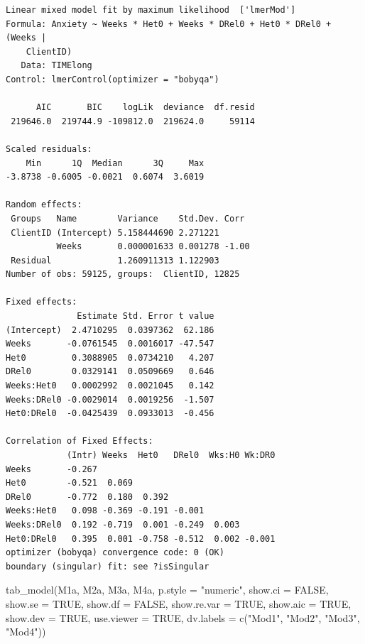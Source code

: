 \documentclass[
  11pt,
]{book}
\newenvironment{Shaded}{\begin{snugshade}}{\end{snugshade}}
\newcommand{\AttributeTok}[1]{\textcolor[rgb]{0.77,0.63,0.00}{#1}}
\newcommand{\ConstantTok}[1]{\textcolor[rgb]{0.00,0.00,0.00}{#1}}
\newcommand{\FunctionTok}[1]{\textcolor[rgb]{0.00,0.00,0.00}{#1}}
\newcommand{\NormalTok}[1]{#1}
\newcommand{\StringTok}[1]{\textcolor[rgb]{0.31,0.60,0.02}{#1}}
\begin{document}
\begin{verbatim}
Linear mixed model fit by maximum likelihood  ['lmerMod']
Formula: Anxiety ~ Weeks * Het0 + Weeks * DRel0 + Het0 * DRel0 + (Weeks |  
    ClientID)
   Data: TIMElong
Control: lmerControl(optimizer = "bobyqa")

      AIC       BIC    logLik  deviance  df.resid 
 219646.0  219744.9 -109812.0  219624.0     59114 

Scaled residuals: 
    Min      1Q  Median      3Q     Max 
-3.8738 -0.6005 -0.0021  0.6074  3.6019 

Random effects:
 Groups   Name        Variance    Std.Dev. Corr 
 ClientID (Intercept) 5.158444690 2.271221      
          Weeks       0.000001633 0.001278 -1.00
 Residual             1.260911313 1.122903      
Number of obs: 59125, groups:  ClientID, 12825

Fixed effects:
              Estimate Std. Error t value
(Intercept)  2.4710295  0.0397362  62.186
Weeks       -0.0761545  0.0016017 -47.547
Het0         0.3088905  0.0734210   4.207
DRel0        0.0329141  0.0509669   0.646
Weeks:Het0   0.0002992  0.0021045   0.142
Weeks:DRel0 -0.0029014  0.0019256  -1.507
Het0:DRel0  -0.0425439  0.0933013  -0.456

Correlation of Fixed Effects:
            (Intr) Weeks  Het0   DRel0  Wks:H0 Wk:DR0
Weeks       -0.267                                   
Het0        -0.521  0.069                            
DRel0       -0.772  0.180  0.392                     
Weeks:Het0   0.098 -0.369 -0.191 -0.001              
Weeks:DRel0  0.192 -0.719  0.001 -0.249  0.003       
Het0:DRel0   0.395  0.001 -0.758 -0.512  0.002 -0.001
optimizer (bobyqa) convergence code: 0 (OK)
boundary (singular) fit: see ?isSingular
\end{verbatim}

\begin{Shaded}
\begin{Highlighting}[]
\FunctionTok{tab\_model}\NormalTok{(M1a, M2a, M3a, M4a, }\AttributeTok{p.style =} \StringTok{"numeric"}\NormalTok{, }\AttributeTok{show.ci =} \ConstantTok{FALSE}\NormalTok{, }\AttributeTok{show.se =} \ConstantTok{TRUE}\NormalTok{, }\AttributeTok{show.df =} \ConstantTok{FALSE}\NormalTok{, }\AttributeTok{show.re.var =} \ConstantTok{TRUE}\NormalTok{, }\AttributeTok{show.aic =} \ConstantTok{TRUE}\NormalTok{, }\AttributeTok{show.dev =} \ConstantTok{TRUE}\NormalTok{, }\AttributeTok{use.viewer =} \ConstantTok{TRUE}\NormalTok{, }\AttributeTok{dv.labels =} \FunctionTok{c}\NormalTok{(}\StringTok{"Mod1"}\NormalTok{, }\StringTok{"Mod2"}\NormalTok{, }\StringTok{"Mod3"}\NormalTok{, }\StringTok{"Mod4"}\NormalTok{))}
\end{Highlighting}
\end{Shaded}
\end{document}
